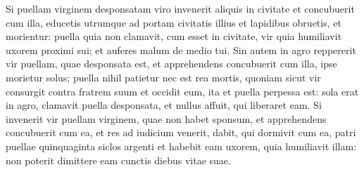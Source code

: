 \begin{biblechapter}
\verse Si puellam virginem desponsatam viro invenerit aliquis in civitate et concubuerit cum illa, 
\verse educetis utrumque ad portam civitatis illius et lapidibus obruetis, et morientur: puella quia non clamavit, cum esset in civitate, vir quia humiliavit uxorem proximi sui; et auferes malum de medio tui. 
\verse Sin autem in agro reppererit vir puellam, quae desponsata est, et apprehendens concubuerit cum illa, ipse morietur solus; 
\verse puella nihil patietur nec est rea mortis, quoniam sicut vir consurgit contra fratrem suum et occidit eum, ita et puella perpessa est: 
\verse sola erat in agro, clamavit puella desponsata, et nullus affuit, qui liberaret eam. 
\verse Si invenerit vir puellam virginem, quae non habet sponsum, et apprehendens concubuerit cum ea, et res ad iudicium venerit, 
\verse dabit, qui dormivit cum ea, patri puellae quinquaginta siclos argenti et habebit eam uxorem, quia humiliavit illam: non poterit dimittere eam cunctis diebus vitae suae. 
\end{biblechapter}

